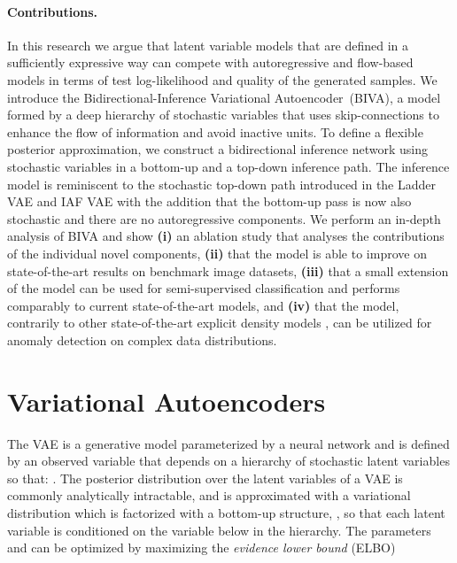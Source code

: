 \documentclass{article}
\def\name{Bidirectional-Inference Variational Autoencoder}
\def\nm{BIVA\xspace}
\begin{document}
\paragraph{Contributions. }In this research we argue that latent variable models that are defined in a sufficiently expressive way can compete with autoregressive and flow-based models in terms of test log-likelihood and quality of the generated samples.
We introduce the \name\ (\nm), a model formed by a deep hierarchy of stochastic variables that uses skip-connections to enhance the flow of information and avoid inactive units.  
To define a flexible posterior approximation, we construct a bidirectional inference network using stochastic variables in a bottom-up and a top-down inference path. The inference model is reminiscent to the stochastic top-down path introduced in the Ladder VAE \cite{Sonderby2016} and IAF VAE \cite{Sonderby2016} with the addition that the bottom-up pass is now also stochastic and there are no autoregressive components.
We perform an in-depth analysis of \nm and show
\textbf{(i)} an ablation study that analyses the contributions of the individual novel components,
\textbf{(ii)} that the model is able to improve on state-of-the-art results on benchmark image datasets, 
\textbf{(iii)} that a small extension of the model can be used for semi-supervised classification and performs comparably to current state-of-the-art models,  and 
\textbf{(iv)}  that the model, contrarily to other state-of-the-art explicit density models \citep{Nalisnick18}, can be utilized for anomaly detection on complex data distributions.


\section{Variational Autoencoders}
The VAE is a generative model parameterized by a neural network  and is defined by an observed variable  that depends on a hierarchy of stochastic latent variables  so that: . The posterior distribution over the latent variables of a VAE is commonly analytically intractable, and is approximated with a variational distribution
which is factorized with a bottom-up structure, , 
so that each latent variable is conditioned on the variable below in the hierarchy. 
The parameters  and  can be optimized by maximizing the  \textit{evidence lower bound} (ELBO) 
\end{document}
